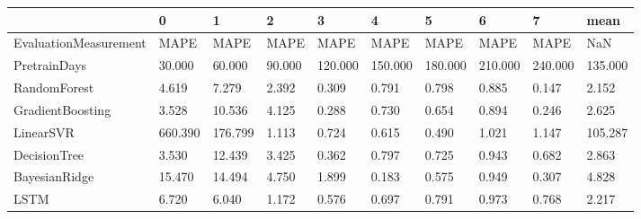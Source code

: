 \begin{tabular}{llllllllll}
\toprule
{} &       0 &       1 &      2 &       3 &       4 &       5 &       6 &       7 &    mean \\
\midrule
EvaluationMeasurement &    MAPE &    MAPE &   MAPE &    MAPE &    MAPE &    MAPE &    MAPE &    MAPE &     NaN \\
PretrainDays          &  30.000 &  60.000 & 90.000 & 120.000 & 150.000 & 180.000 & 210.000 & 240.000 & 135.000 \\
RandomForest          &   4.619 &   7.279 &  2.392 &   0.309 &   0.791 &   0.798 &   0.885 &   0.147 &   2.152 \\
GradientBoosting      &   3.528 &  10.536 &  4.125 &   0.288 &   0.730 &   0.654 &   0.894 &   0.246 &   2.625 \\
LinearSVR             & 660.390 & 176.799 &  1.113 &   0.724 &   0.615 &   0.490 &   1.021 &   1.147 & 105.287 \\
DecisionTree          &   3.530 &  12.439 &  3.425 &   0.362 &   0.797 &   0.725 &   0.943 &   0.682 &   2.863 \\
BayesianRidge         &  15.470 &  14.494 &  4.750 &   1.899 &   0.183 &   0.575 &   0.949 &   0.307 &   4.828 \\
LSTM                  &   6.720 &   6.040 &  1.172 &   0.576 &   0.697 &   0.791 &   0.973 &   0.768 &   2.217 \\
\bottomrule
\end{tabular}
